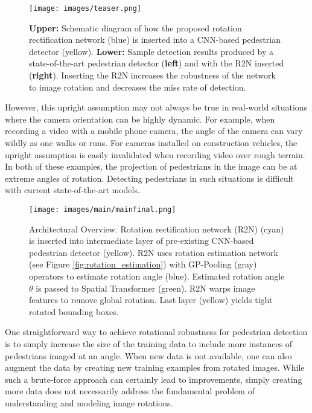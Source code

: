 \documentclass[10pt,twocolumn,letterpaper]{article}
\begin{document}
\begin{figure}[!t]
\texttt{[image: images/teaser.png]}
\caption{ \textbf{Upper:} Schematic diagram of how the proposed rotation rectification network (blue) is inserted into a CNN-based pedestrian detector (yellow). \textbf{Lower:} Sample detection results produced by a state-of-the-art pedestrian detector (\textbf{left}) and with the R2N inserted (\textbf{right}). Inserting the R2N increases the robustness of the network to image rotation and decreases the miss rate of detection.}
\end{figure}
However, this upright assumption may not always be true in real-world situations where the camera orientation can be highly dynamic. For example, when recording a video with a mobile phone camera, the angle of the camera can vary wildly as one walks or runs. For cameras installed on construction vehicles, the upright assumption is easily invalidated when recording video over rough terrain. In both of these examples, the projection of pedestrians in the image can be at extreme angles of rotation. Detecting pedestrians in such situations is difficult with current state-of-the-art models.



\begin{figure*}[!t]
    \centering
    \texttt{[image: images/main/mainfinal.png]}
    \caption{Architectural Overview. Rotation rectification network (R2N) (cyan) is inserted into intermediate layer of pre-existing CNN-based pedestrian detector (yellow). R2N uses rotation estimation network (see Figure \ref{fig:rotation_estimation}) with GP-Pooling (gray) operators to estimate rotation angle (blue). Estimated rotation angle $\theta$ is passed to Spatial Transformer (green). R2N warps image features to remove global rotation. Last layer (yellow) yields tight rotated bounding boxes.}
    \label{fig:main}
    \vspace{-3mm}
\end{figure*}

One straightforward way to achieve rotational robustness for pedestrian detection is to simply increase the size of the training data to include more instances of pedestrians imaged at an angle. When new data is not available, one can also augment the data \cite{VanDyk2001} by creating new training examples from rotated images. While such a brute-force approach can certainly lead to improvements, simply creating more data does not necessarily address the fundamental problem of understanding and modeling image rotations.
\end{document}
